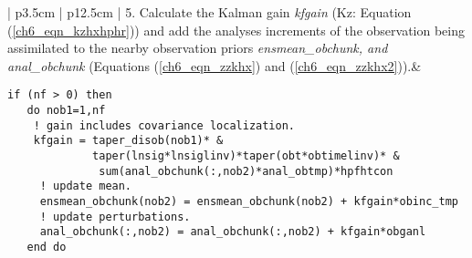 \begin{footnotesize}
\begin{center}
\begin{tabular}{| p{3.5cm} | p{12.5cm} |}
5. Calculate the Kalman gain \textit{kfgain} (Kz: Equation (\ref{ch6_eqn_kzhxhphr})) and add the analyses increments of the observation being assimilated to the nearby observation priors \textit{ensmean\_obchunk, and anal\_obchunk} (Equations (\ref{ch6_eqn_zzkhx}) and (\ref{ch6_eqn_zzkhx2})).&
\begin{lstlisting}[basicstyle=\ttfamily\scriptsize]
if (nf > 0) then
   do nob1=1,nf
    ! gain includes covariance localization.
    kfgain = taper_disob(nob1)* &
             taper(lnsig*lnsiglinv)*taper(obt*obtimelinv)* &
              sum(anal_obchunk(:,nob2)*anal_obtmp)*hpfhtcon
     ! update mean.
     ensmean_obchunk(nob2) = ensmean_obchunk(nob2) + kfgain*obinc_tmp
     ! update perturbations.
     anal_obchunk(:,nob2) = anal_obchunk(:,nob2) + kfgain*obganl
   end do
\end{lstlisting}
\\
\hline
\end{tabular}
\end{center}
\end{footnotesize}
